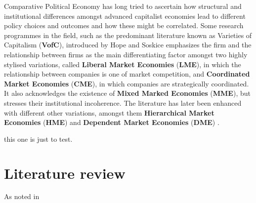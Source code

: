 \documentclass{article}
\begin{document}
\label{para:CPE}
    Comparative Political Economy has long tried to ascertain how structural and institutional differences amongst advanced capitalist economies lead to different policy choices and outcomes and how these might be correlated. Some research programmes in the field, such as the predominant literature known as Varieties of Capitalism (\textbf{VofC}), introduced by Hope and Soskice \autocite*{hall_introduction_2001} emphasizes the firm and the relationship between firms as the main differentiating factor amongst two highly stylised variations, called \textbf{Liberal Market Economies} (\textbf{LME}), in which the relationship between companies is one of market competition, and \textbf{Coordinated Market Economies} (\textbf{CME}), in which companies are strategically coordinated. It also acknowledges the existence of \textbf{Mixed Marked Economies} (\textbf{MME}), but stresses their institutional incoherence. The literature has later been enhanced with different other variations, amongst them  \textbf{Hierarchical Market Economies} (\textbf{HME}) \autocite{schneider_hierarchical_2009} and \textbf{Dependent Market Economies} (\textbf{DME}) \autocites{nolke_enlarging_2009}{ban_cocktail_2013}{soreg_patterns_2019}.


    \label{para:new}
    this one is just to test.

\section{Literature review}
As noted in \autocite{kruppe_labour_2014} \autocite{blanchard_hysteresis_1986}
\end{document}
